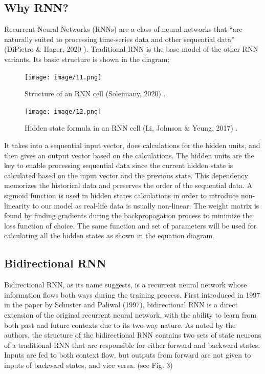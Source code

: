 \documentclass[letterpaper, 10 pt, conference]{ieeeconf}  %
\begin{document}
    \subsection{Why RNN?}
        Recurrent Neural Networks (RNNs) are a class of neural networks that “are naturally suited to processing time-series data and other sequential data” (DiPietro \& Hager, 2020 \cite{zhou_rueckert_fichtinger_2020}). Traditional RNN is the base model of the other RNN variants. Its basic structure is shown in the diagram:
        
        \begin{figure}[thpb]
            \centering
             \texttt{[image: image/11.png]}
            \caption{Structure of an RNN cell (Soleimany, 2020) \cite{soleimany}.}
            \label{figurelabel}
        \end{figure}

        \begin{figure}[thpb]
            \centering
             \texttt{[image: image/12.png]}
            \caption{Hidden state formula in an RNN cell (Li, Johnson \& Yeung, 2017) \cite{li_johnson_yeung}.}
            \label{figurelabel}
        \end{figure}

        It takes into a sequential input vector, does calculations for the hidden units, and then gives an output vector based on the calculations. The hidden units are the key to enable processing sequential data since the current hidden state is calculated based on the input vector and the previous state. This dependency memorizes the historical data and preserves the order of the sequential data. A sigmoid function is used in hidden states calculations in order to introduce non-linearity to our model as real-life data is usually non-linear. The weight matrix is found by finding gradients during the backpropagation process to minimize the loss function of choice. The same function and set of parameters will be used for calculating all the hidden states as shown in the equation diagram.

    \subsection{Bidirectional RNN}
        Bidirectional RNN, as its name suggests, is a recurrent neural network whose information flows both ways during the training process. First introduced in 1997 in the paper by Schuster and Paliwal (1997), bidirectional RNN is a direct extension of the original recurrent neural network, with the ability to learn from both past and future contexts due to its two-way nature. As noted by the authors, the structure of the bidirectional RNN contains two sets of state neurons of a traditional RNN that are responsible for either forward and backward states. Inputs are fed to both context flow, but outputs from forward are not given to inputs of backward states, and vice versa. (see Fig. 3)
        
\end{document}
